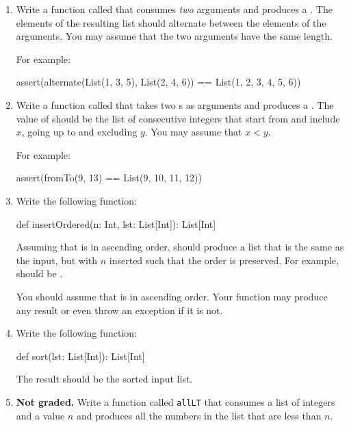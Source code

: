 \documentclass[9pt]{extbook}
\begin{document}
\begin{enumerate}
  \item Write a function called  that consumes \emph{two}
   arguments and produces a .
  The elements of the resulting list should alternate between the elements of
  the arguments. You may assume that the two arguments have the same
  length.

  For example:

  \begin{scalacode}
  assert(alternate(List(1, 3, 5), List(2, 4, 6)) == List(1, 2, 3, 4, 5, 6))
  \end{scalacode}

  \item Write a function called  that takes
  two s as arguments and produces a .
  The value of  should be the list of consecutive
  integers that start from and include $x$, going up to and excluding $y$.
  You may assume that $x < y$.

  For example:
  \begin{scalacode}
  assert(fromTo(9, 13) == List(9, 10, 11, 12))
  \end{scalacode}

  \item Write the following function:

  \begin{scalacode}
  def insertOrdered(n: Int, lst: List[Int]): List[Int]
  \end{scalacode}

  Assuming that  is in ascending order,
   should produce a list that is the same as
  the input, but with $n$ inserted such that the order is preserved.
  For example,  should be
  .

  You should assume that  is in ascending order. Your function
   may produce any result or even throw an exception if it is not.

   \item Write the following function:

   \begin{scalacode}
   def sort(lst: List[Int]): List[Int]
   \end{scalacode}

   The result should be the sorted input list.

   \item \textbf{Not graded.} Write a function called \lstinline|allLT|
   that consumes a list of integers and a value $n$ and produces all the numbers
   in the list that are less than $n$.


\end{enumerate}
\end{document}

